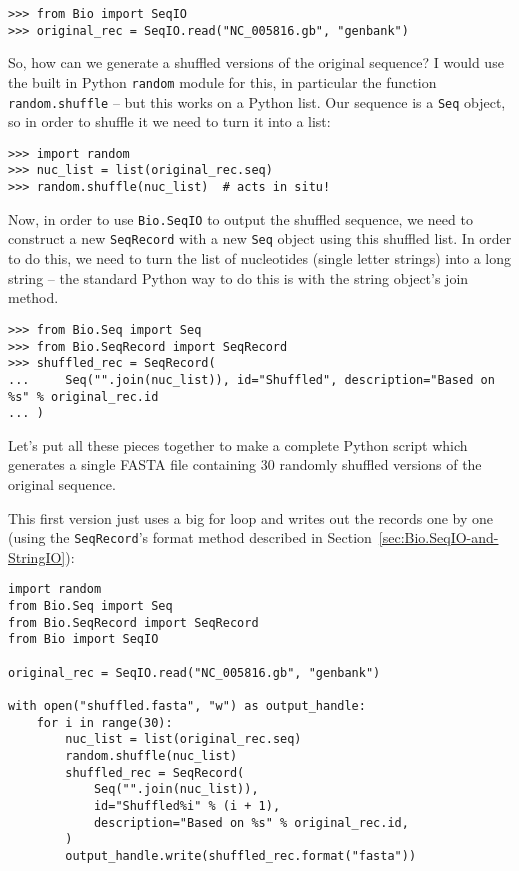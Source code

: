 \begin{verbatim}
>>> from Bio import SeqIO
>>> original_rec = SeqIO.read("NC_005816.gb", "genbank")
\end{verbatim}

So, how can we generate a shuffled versions of the original sequence?  I would
use the built in Python \verb|random| module for this, in particular the function
\verb|random.shuffle| -- but this works on a Python list.  Our sequence is a
\verb|Seq| object, so in order to shuffle it we need to turn it into a list:

\begin{verbatim}
>>> import random
>>> nuc_list = list(original_rec.seq)
>>> random.shuffle(nuc_list)  # acts in situ!
\end{verbatim}

Now, in order to use \verb|Bio.SeqIO| to output the shuffled sequence, we need
to construct a new \verb|SeqRecord| with a new \verb|Seq| object using this
shuffled list.  In order to do this, we need to turn the list of nucleotides
(single letter strings) into a long string -- the standard Python way to do
this is with the string object's join method.

\begin{verbatim}
>>> from Bio.Seq import Seq
>>> from Bio.SeqRecord import SeqRecord
>>> shuffled_rec = SeqRecord(
...     Seq("".join(nuc_list)), id="Shuffled", description="Based on %s" % original_rec.id
... )
\end{verbatim}

Let's put all these pieces together to make a complete Python script which
generates a single FASTA file containing 30 randomly shuffled versions of
the original sequence.

This first version just uses a big for loop and writes out the records one by one
(using the \verb|SeqRecord|'s format method described in
Section~\ref{sec:Bio.SeqIO-and-StringIO}):

\begin{verbatim}
import random
from Bio.Seq import Seq
from Bio.SeqRecord import SeqRecord
from Bio import SeqIO

original_rec = SeqIO.read("NC_005816.gb", "genbank")

with open("shuffled.fasta", "w") as output_handle:
    for i in range(30):
        nuc_list = list(original_rec.seq)
        random.shuffle(nuc_list)
        shuffled_rec = SeqRecord(
            Seq("".join(nuc_list)),
            id="Shuffled%i" % (i + 1),
            description="Based on %s" % original_rec.id,
        )
        output_handle.write(shuffled_rec.format("fasta"))
\end{verbatim}

